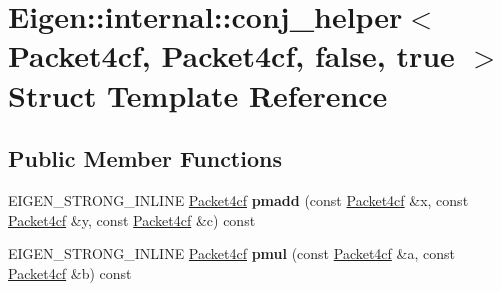 \hypertarget{struct_eigen_1_1internal_1_1conj__helper_3_01_packet4cf_00_01_packet4cf_00_01false_00_01true_01_4}{}\section{Eigen\+:\+:internal\+:\+:conj\+\_\+helper$<$ Packet4cf, Packet4cf, false, true $>$ Struct Template Reference}
\label{struct_eigen_1_1internal_1_1conj__helper_3_01_packet4cf_00_01_packet4cf_00_01false_00_01true_01_4}
\subsection*{Public Member Functions}
\begin{DoxyCompactItemize}
\item 
\mbox{\label{struct_eigen_1_1internal_1_1conj__helper_3_01_packet4cf_00_01_packet4cf_00_01false_00_01true_01_4_a6d6a6ef4f67a8efd530debc6e9009222}} 
E\+I\+G\+E\+N\+\_\+\+S\+T\+R\+O\+N\+G\+\_\+\+I\+N\+L\+I\+NE \hyperlink{struct_eigen_1_1internal_1_1_packet4cf}{Packet4cf} {\bfseries pmadd} (const \hyperlink{struct_eigen_1_1internal_1_1_packet4cf}{Packet4cf} \&x, const \hyperlink{struct_eigen_1_1internal_1_1_packet4cf}{Packet4cf} \&y, const \hyperlink{struct_eigen_1_1internal_1_1_packet4cf}{Packet4cf} \&c) const
\item 
\mbox{\label{struct_eigen_1_1internal_1_1conj__helper_3_01_packet4cf_00_01_packet4cf_00_01false_00_01true_01_4_a19ff6d80791dd7ee3efa068187c4f6d4}} 
E\+I\+G\+E\+N\+\_\+\+S\+T\+R\+O\+N\+G\+\_\+\+I\+N\+L\+I\+NE \hyperlink{struct_eigen_1_1internal_1_1_packet4cf}{Packet4cf} {\bfseries pmul} (const \hyperlink{struct_eigen_1_1internal_1_1_packet4cf}{Packet4cf} \&a, const \hyperlink{struct_eigen_1_1internal_1_1_packet4cf}{Packet4cf} \&b) const
\item 
\mbox{\label{struct_eigen_1_1internal_1_1conj__helper_3_01_packet4cf_00_01_packet4cf_00_01false_00_01true_01_4_a6d6a6ef4f67a8efd530debc6e9009222}} 

\end{DoxyCompactItemize}
